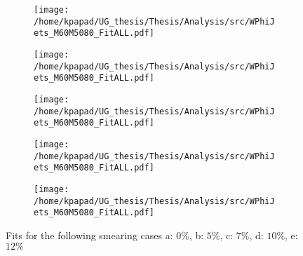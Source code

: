 \begin{figure}[htbp]
\centering
\begin{subfigure}{0.45\textwidth}
\centering
\texttt{[image: /home/kpapad/UG\_thesis/Thesis/Analysis/src/WPhiJets\_M60M5080\_FitALL.pdf]}
\caption{}
\end{subfigure}
\begin{subfigure}{0.45\textwidth}
\centering
\texttt{[image: /home/kpapad/UG\_thesis/Thesis/Analysis/src/WPhiJets\_M60M5080\_FitALL.pdf]}
\caption{}
\end{subfigure}

\begin{subfigure}{0.45\textwidth}
\centering
\texttt{[image: /home/kpapad/UG\_thesis/Thesis/Analysis/src/WPhiJets\_M60M5080\_FitALL.pdf]}
\caption{}
\end{subfigure}
\begin{subfigure}{0.45\textwidth}
\centering
\texttt{[image: /home/kpapad/UG\_thesis/Thesis/Analysis/src/WPhiJets\_M60M5080\_FitALL.pdf]}
\caption{}
\end{subfigure}

\begin{subfigure}{0.45\textwidth}
\centering
\texttt{[image: /home/kpapad/UG\_thesis/Thesis/Analysis/src/WPhiJets\_M60M5080\_FitALL.pdf]}
\caption{}
\end{subfigure}
\caption{Fits for the following smearing cases a: $0\%$, b: $5\%$, c: $7\%$, d: $10\%$, e: $12\%$}
\label{fig:Lightfits}
\end{figure}
